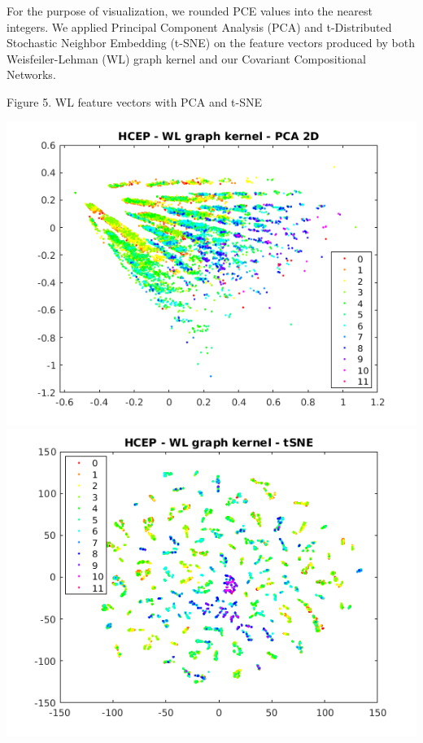 \documentclass[a4paper]{article}
\begin{document}
For the purpose of visualization, we rounded PCE values into the nearest integers. We applied Principal Component Analysis (PCA) and t-Distributed Stochastic Neighbor Embedding (t-SNE) \cite{Maaten} on the feature vectors produced by both Weisfeiler-Lehman (WL) graph kernel and our Covariant Compositional Networks.

\begin{center}
Figure 5. WL feature vectors with PCA and t-SNE
\end{center}
\begin{center}
\includegraphics[scale=0.25]{PCA_WL}
\includegraphics[scale=0.25]{tSNE_WL}
\end{center}
\end{document}
